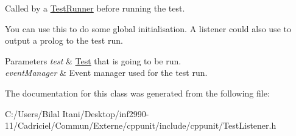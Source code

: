 Called by a \hyperlink{class_test_runner}{Test\+Runner} before running the test. 

You can use this to do some global initialisation. A listener could also use to output a \textquotesingle{}prolog\textquotesingle{} to the test run.


\begin{DoxyParams}{Parameters}
{\em test} & \hyperlink{class_test}{Test} that is going to be run. \\
\hline
{\em event\+Manager} & Event manager used for the test run. \\
\hline
\end{DoxyParams}


The documentation for this class was generated from the following file\+:\begin{DoxyCompactItemize}
\item 
C\+:/\+Users/\+Bilal Itani/\+Desktop/inf2990-\/11/\+Cadriciel/\+Commun/\+Externe/cppunit/include/cppunit/Test\+Listener.\+h\end{DoxyCompactItemize}
